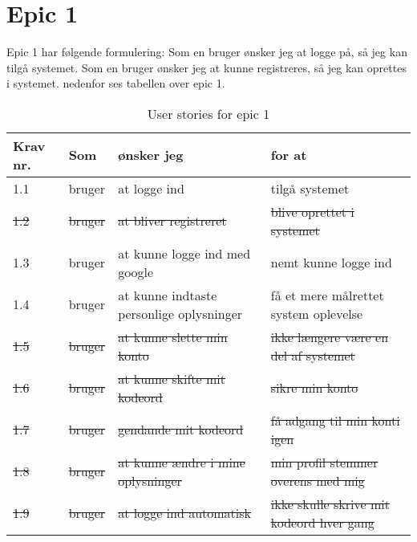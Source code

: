 \section{Epic 1}
Epic 1 har følgende formulering: 
Som en bruger ønsker jeg at logge på, så jeg kan tilgå systemet.
Som en bruger ønsker jeg at kunne registreres, så jeg kan oprettes i systemet.
nedenfor ses tabellen over epic 1.

\begin{table}[H]
    \centering
    \caption{User stories for epic 1}
    \label{tab:us-epic1}
    \begin{tabular}{p{1cm}|p{2cm}|p{6cm}|p{6cm}}
        \textbf{Krav nr.} & \textbf{Som} & \textbf{ønsker jeg}                      & \textbf{for at}                          \\
        \hline
        1.1               & bruger       & at logge ind                             & tilgå systemet                           \\
        \hline
		\sout{1.2}               & \sout{bruger}       & \sout{at bliver registreret}                    & \sout{blive oprettet i systemet}   \\
        \hline
        1.3               & bruger       & at kunne logge ind med google            & nemt kunne logge ind                     \\
        \hline
        1.4               & bruger       & at kunne indtaste personlige oplysninger & få et mere målrettet system oplevelse    \\
		\hline
     	\sout{1.5}        & \sout{bruger}       & \sout{at kunne slette min konto}  & \sout{ikke længere være en del af systemet}  \\ 
        \hline
		\sout{1.6}        & \sout{bruger}        & \sout{at kunne skifte mit kodeord}              & \sout{sikre min konto}           \\
        \hline
        \sout{1.7}        & \sout{bruger}        & \sout{gendande mit kodeord}                     & \sout{få adgang til min konti igen}             \\
        \hline
        \sout{1.8}        & \sout{bruger}        & \sout{at kunne ændre i mine oplysninger}        & \sout{min profil stemmer overens med mig}       \\
        \hline
        \sout{1.9}        & \sout{bruger}        & \sout{at logge ind automatisk}           & \sout{ikke skulle skrive mit kodeord hver gang} \\
    \end{tabular}
\end{table}


